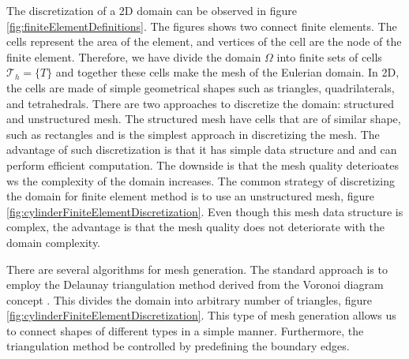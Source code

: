 The discretization of a 2D domain can be observed in figure \ref{fig:finiteElementDefinitions}. The figures shows two connect finite elements. The cells represent the area of the element, and vertices of the cell are the node of the finite element. Therefore, we have divide the domain $\Omega$ into finite sets of cells $\mathcal{T}_h = \{T\}$ and together these cells make the mesh of the Eulerian domain. In 2D, the cells are made of simple geometrical shapes such as triangles, quadrilaterals, and tetrahedrals. There are two approaches to discretize the domain: structured and unstructured mesh. The structured mesh have cells that are of similar shape, such as rectangles and is the simplest approach in discretizing the mesh. The advantage of such discretization is that it has simple data structure and and can perform efficient computation. The downside is that the mesh quality deterioates ws the complexity of the domain increases. The common strategy of discretizing the domain for finite element method is to use an unstructured mesh, figure \ref{fig:cylinderFiniteElementDiscretization}. Even though this mesh data structure is complex, the advantage is that the mesh quality does not deteriorate with the domain complexity.

There are several algorithms for mesh generation. The standard approach is to employ the Delaunay triangulation method derived from the Voronoi diagram concept \cite{Carey1997}. This divides the domain into arbitrary number of triangles, figure \ref{fig:cylinderFiniteElementDiscretization}. This type of mesh generation allows us to connect shapes of different types in a simple manner. Furthermore, the triangulation method be controlled by predefining the boundary edges.

